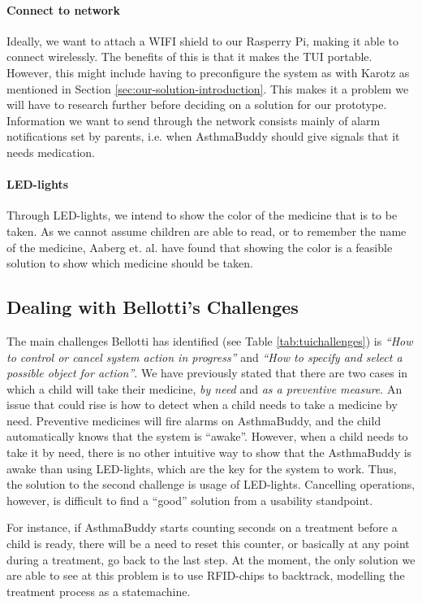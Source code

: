 \paragraph{Connect to network}
Ideally, we want to attach a WIFI shield to our Rasperry Pi, making it able to connect wirelessly. The benefits of this is that it makes the TUI portable. However, this might include having to preconfigure the system as with Karotz as mentioned in Section \ref{sec:our-solution-introduction}. This makes it a problem we will have to research further before deciding on a solution for our prototype. Information we want to send through the network consists mainly of alarm notifications set by parents, i.e. when AsthmaBuddy should give signals that it needs medication. 

\paragraph{LED-lights}
Through LED-lights, we intend to show the color of the medicine that is to be taken. As we cannot assume children are able to read, or to remember the name of the medicine, Aaberg et. al. have found that showing the color is a feasible solution to show which medicine should be taken\cite{CustomerDriven}. 

\subsection{Dealing with Bellotti's Challenges}
\label{sec:handling-challenges}
The main challenges Bellotti has identified (see Table \ref{tab:tuichallenges}) is \emph{``How to control or cancel system action in progress''} and \emph{``How to specify and select a possible object for action''}. We have previously stated that there are two cases in which a child will take their medicine, \emph{by need} and \emph{as a preventive measure}. An issue that could rise is how to detect when a child needs to take a medicine by need. Preventive medicines will fire alarms on AsthmaBuddy, and the child automatically knows that the system is ``awake''. However, when a child needs to take it by need, there is no other intuitive way to show that the AsthmaBuddy is awake than using LED-lights, which are the key for the system to work. Thus, the solution to the second challenge is usage of LED-lights. Cancelling operations, however, is difficult to find a ``good'' solution from a usability standpoint. 

For instance, if AsthmaBuddy starts counting seconds on a treatment before a child is ready, there will be a need to reset this counter, or basically at any point during a treatment, go back to the last step. At the moment, the only solution we are able to see at this problem is to use RFID-chips to backtrack, modelling the treatment process as a statemachine. 



